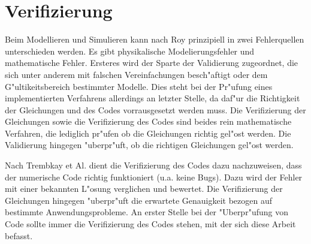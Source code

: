 \newpage
\chapter{Verifizierung}
Beim Modellieren und Simulieren kann nach Roy \cite{roy} prinzipiell in zwei Fehlerquellen unterschieden werden. Es gibt physikalische Modelierungsfehler und mathematische Fehler. Ersteres wird der Sparte der Validierung zugeordnet, die sich unter anderem mit falschen Vereinfachungen besch"aftigt oder dem G"ultikeitsbereich bestimmter Modelle. Dies steht bei der Pr"ufung eines implementierten Verfahrens allerdings an letzter Stelle, da daf"ur die Richtigkeit der Gleichungen und des Codes vorrausgesetzt werden muss.
Die Verifizierung der Gleichungen sowie die Verifizierung des Codes sind beides rein mathematische Verfahren, die lediglich pr"ufen ob die Gleichungen richtig gel"ost werden. Die Validierung hingegen "uberpr"uft, ob die richtigen Gleichungen gel"ost werden\cite{tremblay}.

Nach Trembkay et Al. \cite{tremblay} dient die Verifizierung des Codes dazu nachzuweisen, dass der numerische Code richtig funktioniert (u.a. keine Bugs). Dazu wird der Fehler mit einer bekannten L"osung verglichen und bewertet. Die Verifizierung der Gleichungen hingegen "uberpr"uft die erwartete Genauigkeit bezogen auf bestimmte Anwendungsprobleme. An erster Stelle bei der "Uberpr"ufung von Code sollte immer die Verifizierung des Codes stehen, mit der sich diese Arbeit befasst.


